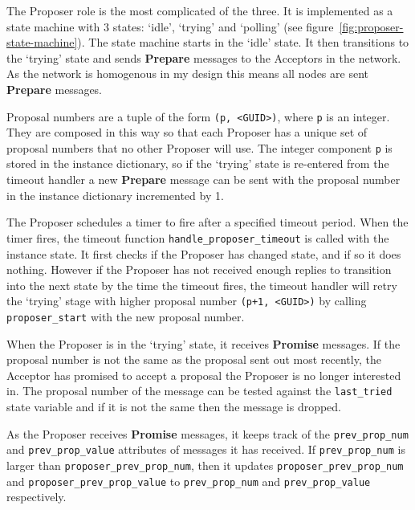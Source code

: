 \documentclass[12pt,twoside,notitlepage]{report}
\newcommand{\msg}[1] {{\bf #1}}         %
\begin{document}
The Proposer role is the most complicated of the three. It is implemented as a state machine with
3 states: `idle', `trying' and `polling' (see figure~\ref{fig:proposer-state-machine}). The
state machine starts in the `idle' state. It then transitions to the `trying' state and sends
\msg{Prepare} messages to the Acceptors in the network. As the network is homogenous in my design
this means all nodes are sent \msg{Prepare} messages.

Proposal numbers are a tuple of the form \verb+(p, <GUID>)+, where \verb+p+ is an integer. They
are composed in this way so that each Proposer has a unique set of proposal numbers that no other
Proposer will use. The integer component \verb+p+ is stored in the instance dictionary, so if the
`trying' state is re-entered from the timeout handler a new \msg{Prepare} message can be sent with the
proposal number in the instance dictionary incremented by 1.

The Proposer schedules a timer to fire after a specified timeout period.  When the timer fires,
the timeout function \verb+handle_proposer_timeout+ is called with the instance state.  It first
checks if the Proposer has changed state, and if so it does nothing. However if the Proposer has
not received enough replies to transition into the next state by the time the timeout fires, the
timeout handler will retry the `trying' stage with higher proposal number \verb$(p+1, <GUID>)$ by
calling \verb+proposer_start+ with the new proposal number.

When the Proposer is in the `trying' state, it receives \msg{Promise} messages. If the proposal
number is not the same as the proposal sent out most recently, the Acceptor has promised to accept
a proposal the Proposer is no longer interested in. The proposal number of the message can be
tested against the \verb+last_tried+ state variable and if it is not the same then the message is dropped.

As the Proposer receives \msg{Promise} messages, it keeps track of the \verb+prev_prop_num+ and
\verb+prev_prop_value+ attributes of messages it has received. If \verb+prev_prop_num+ is larger
than \verb+proposer_prev_prop_num+, then it updates \verb+proposer_prev_prop_num+
and \verb+proposer_prev_prop_value+ to \verb+prev_prop_num+ and \verb+prev_prop_value+
respectively.
\end{document}
